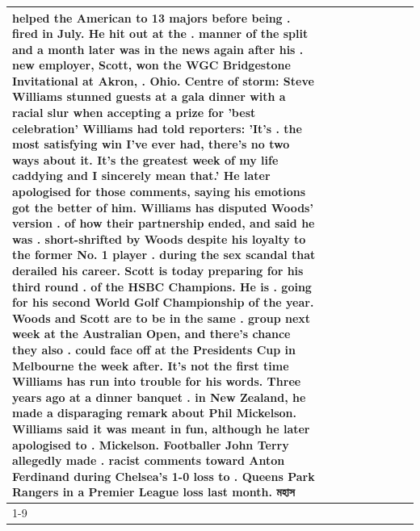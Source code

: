 \begin{table}[H]
\begin{tabular}{lllrlllll}
helped the American to 13 majors before being . fired in July. He hit out at the . manner of the split and a month later was in the news again after his . new employer, Scott, won the WGC Bridgestone Invitational at Akron, . Ohio. Centre of storm: Steve Williams stunned guests at a gala dinner with a racial slur when accepting a prize for 'best celebration' Williams had told reporters: 'It's . the most satisfying win I've ever had, there's no two ways about it. It's the greatest week of my life caddying and I sincerely mean that.' He later apologised for those comments, saying his emotions got the better of him. Williams has disputed Woods' version . of how their partnership ended, and said he was . short-shrifted by Woods despite his loyalty to the former No. 1 player . during the sex scandal that derailed his career. Scott is today preparing for his third round . of the HSBC Champions. He is . going for his second World Golf Championship of the year. Woods and Scott are to be in the same . group next week at the Australian Open, and there's chance they also . could face off at the Presidents Cup in Melbourne the week after. It's not the first time Williams has run into trouble for his words. Three years ago at a dinner banquet . in New Zealand, he made a disparaging remark about Phil Mickelson. Williams said it was meant in fun, although he later apologised to . Mickelson. Footballer John Terry allegedly made . racist comments toward Anton Ferdinand during Chelsea's 1-0 loss to . Queens Park Rangers in a Premier League loss last month. মহাস \\
\cline{1-9}

\end{tabular}
\end{table}

